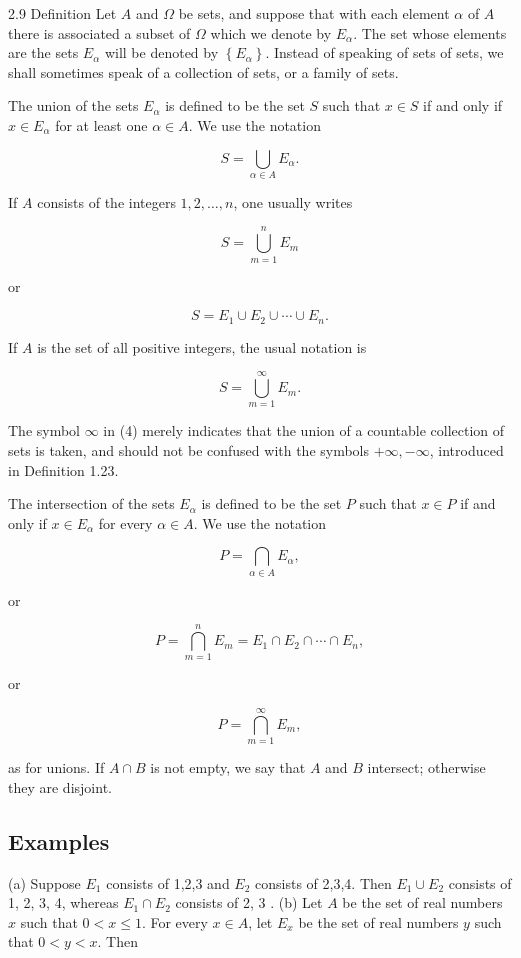 \documentclass[10pt]{article}
\begin{document}
2.9 Definition Let $A$ and $\Omega$ be sets, and suppose that with each element $\alpha$ of $A$ there is associated a subset of $\Omega$ which we denote by $E_{\alpha}$. The set whose elements are the sets $E_{\alpha}$ will be denoted by $\left\{E_{\alpha}\right\}$. Instead of speaking of sets of sets, we shall sometimes speak of a collection of sets, or a family of sets.

The union of the sets $E_{\alpha}$ is defined to be the set $S$ such that $x \in S$ if and only if $x \in E_{\alpha}$ for at least one $\alpha \in A$. We use the notation

$$
S=\bigcup_{\alpha \in A} E_{\alpha} .
$$

If $A$ consists of the integers $1,2, \ldots, n$, one usually writes

$$
S=\bigcup_{m=1}^{n} E_{m}
$$

or

$$
S=E_{1} \cup E_{2} \cup \cdots \cup E_{n} .
$$

If $A$ is the set of all positive integers, the usual notation is

$$
S=\bigcup_{m=1}^{\infty} E_{m} .
$$

The symbol $\infty$ in (4) merely indicates that the union of a countable collection of sets is taken, and should not be confused with the symbols $+\infty,-\infty$, introduced in Definition 1.23.

The intersection of the sets $E_{\alpha}$ is defined to be the set $P$ such that $x \in P$ if and only if $x \in E_{\alpha}$ for every $\alpha \in A$. We use the notation

$$
P=\bigcap_{\alpha \in A} E_{\alpha},
$$

or

$$
P=\bigcap_{m=1}^{n} E_{m}=E_{1} \cap E_{2} \cap \cdots \cap E_{n},
$$

or

$$
P=\bigcap_{m=1}^{\infty} E_{m},
$$

as for unions. If $A \cap B$ is not empty, we say that $A$ and $B$ intersect; otherwise they are disjoint.

\subsection{Examples}
(a) Suppose $E_{1}$ consists of 1,2,3 and $E_{2}$ consists of 2,3,4. Then $E_{1} \cup E_{2}$ consists of 1, 2, 3, 4, whereas $E_{1} \cap E_{2}$ consists of 2, 3 . (b) Let $A$ be the set of real numbers $x$ such that $0<x \leq 1$. For every $x \in A$, let $E_{x}$ be the set of real numbers $y$ such that $0<y<x$. Then
\end{document}
